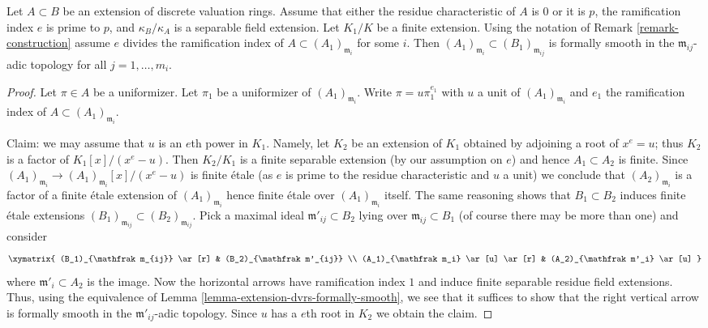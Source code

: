 \begin{lemma}
\label{lemma-abhyankar}
Let $A \subset B$ be an extension of discrete valuation rings.
Assume that either the residue characteristic of $A$ is $0$
or it is $p$, the ramification index $e$ is prime to $p$, and
$\kappa_B/\kappa_A$ is a separable field extension.
Let $K_1/K$ be a finite extension. Using the notation of
Remark \ref{remark-construction}
assume $e$ divides the ramification index of $A \subset (A_1)_{\mathfrak m_i}$
for some $i$. Then $(A_1)_{\mathfrak m_i} \subset (B_1)_{\mathfrak m_{ij}}$
is formally smooth in the $\mathfrak m_{ij}$-adic topology
for all $j = 1, \ldots, m_i$.
\end{lemma}

\begin{proof}
Let $\pi \in A$ be a uniformizer. Let $\pi_1$ be a uniformizer
of $(A_1)_{\mathfrak m_i}$. Write $\pi = u \pi_1^{e_1}$ with $u$ a unit
of $(A_1)_{\mathfrak m_i}$ and $e_1$ the ramification index of
$A \subset (A_1)_{\mathfrak m_i}$.

\medskip\noindent
Claim: we may assume that $u$ is an $e$th power in $K_1$.
Namely, let $K_2$ be an extension of $K_1$ obtained by
adjoining a root of $x^e = u$; thus $K_2$ is a factor
of $K_1[x]/(x^e - u)$. Then $K_2/K_1$ is a finite
separable extension (by our assumption on $e$)
and hence $A_1 \subset A_2$ is finite.
Since $(A_1)_{\mathfrak m_i} \to (A_1)_{\mathfrak m_i}[x]/(x^e - u)$
is finite \'etale
(as $e$ is prime to the residue characteristic and $u$ a unit)
we conclude that $(A_2)_{\mathfrak m_i}$ is a factor of
a finite \'etale extension of $(A_1)_{\mathfrak m_i}$ hence
finite \'etale over $(A_1)_{\mathfrak m_i}$ itself.
The same reasoning shows that $B_1 \subset B_2$ induces
finite \'etale extensions
$(B_1)_{\mathfrak m_{ij}} \subset (B_2)_{\mathfrak m_{ij}}$.
Pick a maximal ideal $\mathfrak m'_{ij} \subset B_2$
lying over $\mathfrak m_{ij} \subset B_1$
(of course there may be more than one) and consider
$$
\xymatrix{
(B_1)_{\mathfrak m_{ij}} \ar[r] & (B_2)_{\mathfrak m'_{ij}} \\
(A_1)_{\mathfrak m_i} \ar[u] \ar[r] &
(A_2)_{\mathfrak m'_i} \ar[u]
}
$$
where $\mathfrak m'_i \subset A_2$ is the image.
Now the horizontal arrows have ramification index $1$
and induce finite separable residue field extensions.
Thus, using the equivalence of
Lemma \ref{lemma-extension-dvrs-formally-smooth},
we see that it suffices to show that the right vertical
arrow is formally smooth in the $\mathfrak m'_{ij}$-adic topology.
Since $u$ has a $e$th root
in $K_2$ we obtain the claim.


\end{proof}
